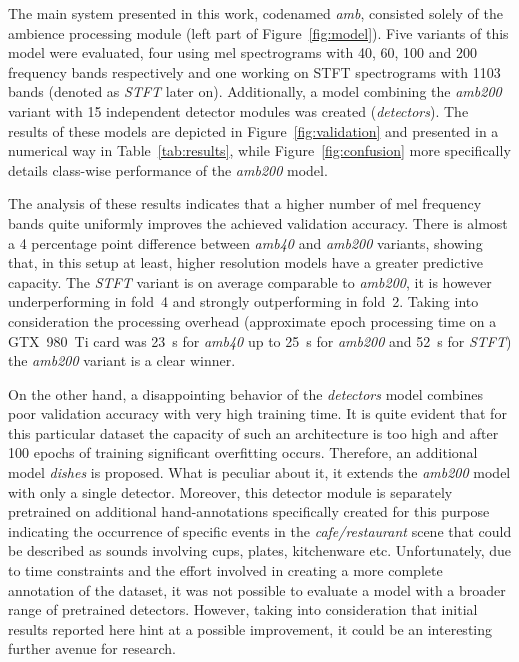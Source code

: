 \documentclass{article}
\begin{document}
\begin{sloppy}
The main system presented in this work, codenamed \textit{amb}, consisted solely of the ambience processing module (left part of Figure~\ref{fig:model}). Five variants of this model were evaluated, four using mel spectrograms with 40, 60, 100 and 200 frequency bands respectively and one working on STFT spectrograms with 1103 bands (denoted as \textit{STFT} later on). Additionally, a model combining the \textit{amb200} variant with 15 independent detector modules was created (\textit{detectors}). The results of these models are depicted in Figure~\ref{fig:validation} and presented in a numerical way in Table~\ref{tab:results}, while Figure~\ref{fig:confusion} more specifically details class-wise performance of the \textit{amb200} model.

The analysis of these results indicates that a higher number of mel frequency bands quite uniformly improves the achieved validation accuracy. There is almost a 4 percentage point difference between \textit{amb40} and \textit{amb200} variants, showing that, in this setup at least, higher resolution models have a greater predictive capacity. The \textit{STFT} variant is on average comparable to \textit{amb200}, it is however underperforming in fold~4 and strongly outperforming in fold~2. Taking into consideration the processing overhead (approximate epoch processing time on a GTX~980~Ti card was 23~s for \textit{amb40} up to 25~s for \textit{amb200} and 52~s for \textit{STFT}) the \textit{amb200} variant is a clear winner.

On the other hand, a disappointing behavior of the \textit{detectors} model combines poor validation accuracy with very high training time. It is quite evident that for this particular dataset the capacity of such an architecture is too high and after 100 epochs of training significant overfitting occurs. Therefore, an additional model \textit{dishes} is proposed. What is peculiar about it, it extends the \textit{amb200} model with only a single detector. Moreover, this detector module is separately pretrained on additional hand-annotations specifically created for this purpose indicating the occurrence of specific events in the \textit{cafe/restaurant} scene that could be described as sounds involving cups, plates, kitchenware etc. Unfortunately, due to time constraints and the effort involved in creating a more complete annotation of the dataset, it was not possible to evaluate a model with a broader range of pretrained detectors. However, taking into consideration that initial results reported here hint at a possible improvement, it could be an interesting further avenue for research. 


\end{sloppy}
\end{document}
